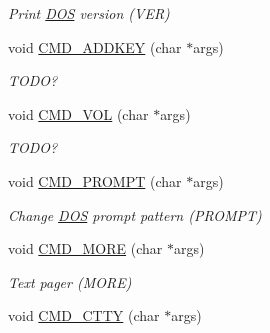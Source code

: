\begin{DoxyCompactItemize}
\begin{DoxyCompactList}\small\item\em Print \hyperlink{classDOS}{D\-O\-S} version (V\-E\-R) \end{DoxyCompactList}\item 
\hypertarget{classDOS__Shell_a655bd9d7fd3f518861ed96332ef5b10c}{void \hyperlink{classDOS__Shell_a655bd9d7fd3f518861ed96332ef5b10c}{C\-M\-D\-\_\-\-A\-D\-D\-K\-E\-Y} (char $\ast$args)}\label{classDOS__Shell_a655bd9d7fd3f518861ed96332ef5b10c}

\begin{DoxyCompactList}\small\item\em T\-O\-D\-O? \end{DoxyCompactList}\item 
\hypertarget{classDOS__Shell_ad4529bb89fb7c10cc6e98cde3b84f876}{void \hyperlink{classDOS__Shell_ad4529bb89fb7c10cc6e98cde3b84f876}{C\-M\-D\-\_\-\-V\-O\-L} (char $\ast$args)}\label{classDOS__Shell_ad4529bb89fb7c10cc6e98cde3b84f876}

\begin{DoxyCompactList}\small\item\em T\-O\-D\-O? \end{DoxyCompactList}\item 
\hypertarget{classDOS__Shell_a11b29015ed77577516d699150068d3fe}{void \hyperlink{classDOS__Shell_a11b29015ed77577516d699150068d3fe}{C\-M\-D\-\_\-\-P\-R\-O\-M\-P\-T} (char $\ast$args)}\label{classDOS__Shell_a11b29015ed77577516d699150068d3fe}

\begin{DoxyCompactList}\small\item\em Change \hyperlink{classDOS}{D\-O\-S} prompt pattern (P\-R\-O\-M\-P\-T) \end{DoxyCompactList}\item 
\hypertarget{classDOS__Shell_a31d3f8107e9fc6bf368b02f5b15c861e}{void \hyperlink{classDOS__Shell_a31d3f8107e9fc6bf368b02f5b15c861e}{C\-M\-D\-\_\-\-M\-O\-R\-E} (char $\ast$args)}\label{classDOS__Shell_a31d3f8107e9fc6bf368b02f5b15c861e}

\begin{DoxyCompactList}\small\item\em Text pager (M\-O\-R\-E) \end{DoxyCompactList}\item 
\hypertarget{classDOS__Shell_ab4e4f875c54408e1c040ee0aa65b5314}{void \hyperlink{classDOS__Shell_ab4e4f875c54408e1c040ee0aa65b5314}{C\-M\-D\-\_\-\-C\-T\-T\-Y} (char $\ast$args)}\label{classDOS__Shell_ab4e4f875c54408e1c040ee0aa65b5314}


\end{DoxyCompactItemize}
